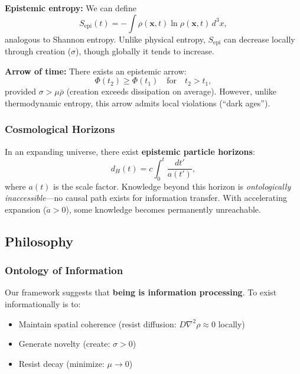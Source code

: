 \documentclass[12pt]{article}
\begin{document}
\textbf{Epistemic entropy:} We can define
\begin{equation}
    S_{\text{epi}}(t) = -\int \rho(\mathbf{x},t) \ln \rho(\mathbf{x},t)\, d^3x,
\end{equation}
analogous to Shannon entropy. Unlike physical entropy, $S_{\text{epi}}$ can decrease locally through creation ($\sigma$), though globally it tends to increase.

\textbf{Arrow of time:} There exists an epistemic arrow:
\begin{equation}
    \Phi(t_2) \geq \Phi(t_1) \quad \text{for} \quad t_2 > t_1,
\end{equation}
provided $\sigma > \mu\bar{\rho}$ (creation exceeds dissipation on average). However, unlike thermodynamic entropy, this arrow admits local violations (``dark ages'').

\subsubsection{Cosmological Horizons}

In an expanding universe, there exist \textbf{epistemic particle horizons}:
\begin{equation}
    d_H(t) = c \int_0^t \frac{dt'}{a(t')},
\end{equation}
where $a(t)$ is the scale factor. Knowledge beyond this horizon is \emph{ontologically inaccessible}---no causal path exists for information transfer. With accelerating expansion ($\ddot{a} > 0$), some knowledge becomes permanently unreachable.

\subsection{Philosophy}

\subsubsection{Ontology of Information}

Our framework suggests that \textbf{being is information processing}. To exist informationally is to:
\begin{itemize}
    \item Maintain spatial coherence (resist diffusion: $D\nabla^2\rho \approx 0$ locally)
    \item Generate novelty (create: $\sigma > 0$)
    \item Resist decay (minimize: $\mu \to 0$)
\end{itemize}
\end{document}
